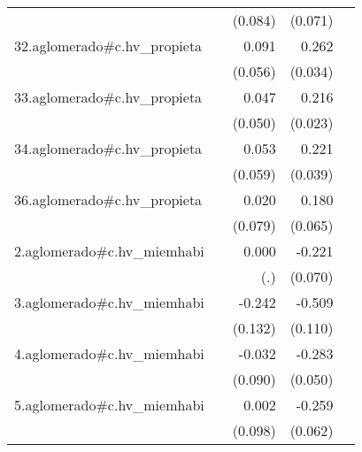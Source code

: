 {\begin{longtable}{l*{4}{D{.}{.}{-1}}}
            &                     &     (0.084)         &     (0.071)         &                     \\
\addlinespace
32.aglomerado#c.hv\_propieta&                     &       0.091         &       0.262\sym{***}&                     \\
            &                     &     (0.056)         &     (0.034)         &                     \\
\addlinespace
33.aglomerado#c.hv\_propieta&                     &       0.047         &       0.216\sym{***}&                     \\
            &                     &     (0.050)         &     (0.023)         &                     \\
\addlinespace
34.aglomerado#c.hv\_propieta&                     &       0.053         &       0.221\sym{***}&                     \\
            &                     &     (0.059)         &     (0.039)         &                     \\
\addlinespace
36.aglomerado#c.hv\_propieta&                     &       0.020         &       0.180\sym{**} &                     \\
            &                     &     (0.079)         &     (0.065)         &                     \\
\addlinespace
2.aglomerado#c.hv\_miemhabi&                     &       0.000         &      -0.221\sym{**} &                     \\
            &                     &         (.)         &     (0.070)         &                     \\
\addlinespace
3.aglomerado#c.hv\_miemhabi&                     &      -0.242         &      -0.509\sym{***}&                     \\
            &                     &     (0.132)         &     (0.110)         &                     \\
\addlinespace
4.aglomerado#c.hv\_miemhabi&                     &      -0.032         &      -0.283\sym{***}&                     \\
            &                     &     (0.090)         &     (0.050)         &                     \\
\addlinespace
5.aglomerado#c.hv\_miemhabi&                     &       0.002         &      -0.259\sym{***}&                     \\
            &                     &     (0.098)         &     (0.062)         &                     \\

\end{longtable}}
